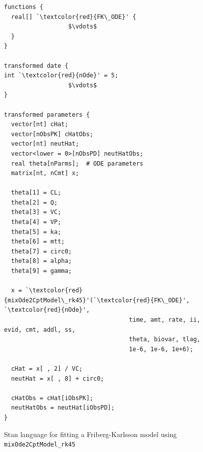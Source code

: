 \documentclass[11pt]{amsart}
\newenvironment{fmpage}[1]
     {\begin{lrbox}{\fmbox}\begin{minipage}{#1}}
     {\end{minipage}\end{lrbox}\fbox{\usebox{\fmbox}}}
\begin{document}
\begin{figure}
\caption{Stan language for fitting a Friberg-Karlsson model using \texttt{mixOde2CptModel\_rk45}}
\begin{center}
\begin{small}
\begin{fmpage}{\textwidth - .75in}
\begin{lstlisting}[basicstyle=\footnotesize\ttfamily,mathescape=true,flexiblecolumns=true,frame=single,escapeinside=`']
functions {
  real[] `\textcolor{red}{FK\_ODE}' {
                  $\vdots$	
  }
}

transformed date {
int `\textcolor{red}{nOde}' = 5;
                  $\vdots$
}

transformed parameters {
  vector[nt] cHat;
  vector[nObsPK] cHatObs;
  vector[nt] neutHat;
  vector<lower = 0>[nObsPD] neutHatObs;
  real theta[nParms];  # ODE parameters
  matrix[nt, nCmt] x;
  
  theta[1] = CL;
  theta[2] = Q;
  theta[3] = VC;
  theta[4] = VP;
  theta[5] = ka;
  theta[6] = mtt;
  theta[7] = circ0;
  theta[8] = alpha;
  theta[9] = gamma;

  x = `\textcolor{red}{mixOde2CptModel\_rk45}'(`\textcolor{red}{FK\_ODE}', `\textcolor{red}{nOde}',
                                   time, amt, rate, ii, evid, cmt, addl, ss,
                                   theta, biovar, tlag,
                                   1e-6, 1e-6, 1e+6);

  cHat = x[ , 2] / VC;
  neutHat = x[ , 8] + circ0;

  cHatObs = cHat[iObsPK];
  neutHatObs = neutHat[iObsPD];
}
\end{lstlisting}
\end{fmpage}
\end{small}
\end{center}
\label{FK_mix2}
\end{figure}
\end{document}

